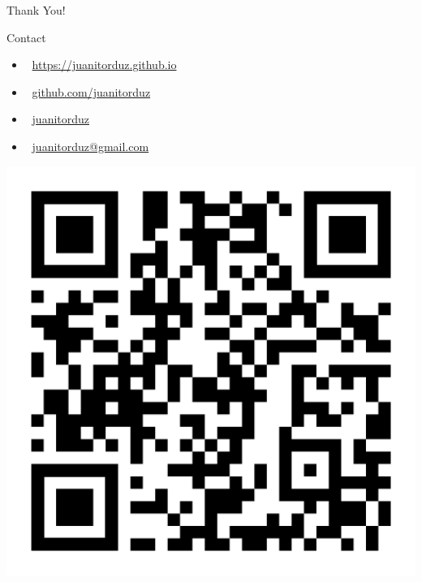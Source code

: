 \documentclass[10pt]{beamer}
\begin{document}
\begin{frame}
\begin{center}
\huge{Thank You!}%
\end{center}

\begin{block}{Contact}
\begin{itemize}
\item \faRocket $\:$ \href{https://juanitorduz.github.io}{https://juanitorduz.github.io}
\item \faGithub $\:$ \href{https://github.com/juanitorduz}{github.com/juanitorduz}
\item \faTwitter $\:$ \href{https://twitter.com/juanitorduz}{juanitorduz}
\item \faEnvelope $\:$ \href{mailto:juanitorduz@gmail.com}{juanitorduz@gmail.com}
\end{itemize}
\end{block}

\begin{center}
\includegraphics[scale=0.08]{images/qr-code-juanitorduz.png} 
\end{center}

\end{frame}
\end{document}
